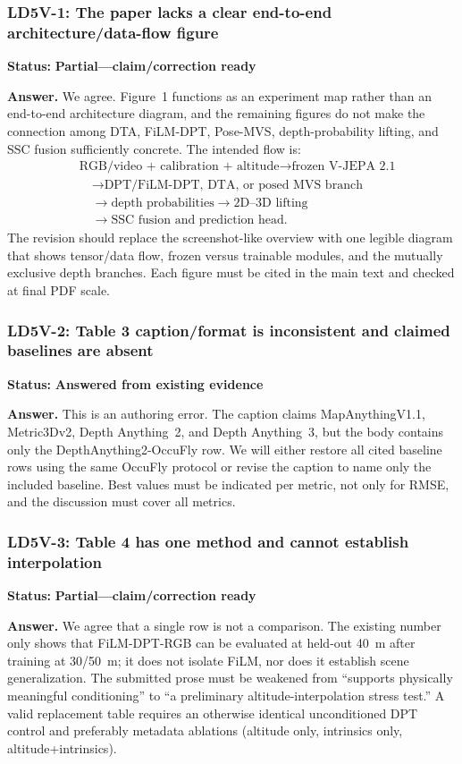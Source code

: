 \documentclass[10pt]{article}
\newcommand{\answered}{\textcolor{answered}{\textbf{Answered from existing evidence}}}
\newcommand{\partialstatus}{\textcolor{partial}{\textbf{Partial---claim/correction ready}}}
\newenvironment{reviewpoint}[2]
  {\subsubsection{#1}\noindent\textbf{Status:} #2\par\smallskip}
  {}
\begin{document}
\begin{reviewpoint}{LD5V-1: The paper lacks a clear end-to-end architecture/data-flow figure}{\partialstatus}
\textbf{Answer.} We agree. Figure~1 functions as an experiment map rather than an
end-to-end architecture diagram, and the remaining figures do not make the connection
among DTA, FiLM-DPT, Pose-MVS, depth-probability lifting, and SSC fusion sufficiently
concrete. The intended flow is:
\begin{align*}
&\text{RGB/video + calibration + altitude}
  \rightarrow \text{frozen V-JEPA 2.1}\\
&\quad\rightarrow \text{DPT/FiLM-DPT, DTA, or posed MVS branch}\\
&\quad\rightarrow \text{depth probabilities}
  \rightarrow \text{2D--3D lifting}\\
&\quad\rightarrow \text{SSC fusion and prediction head}.
\end{align*}
The revision should replace the screenshot-like overview with one legible diagram that
shows tensor/data flow, frozen versus trainable modules, and the mutually exclusive depth
branches. Each figure must be cited in the main text and checked at final PDF scale.
\end{reviewpoint}

\begin{reviewpoint}{LD5V-2: Table 3 caption/format is inconsistent and claimed baselines are absent}{\answered}
\textbf{Answer.} This is an authoring error. The caption claims MapAnythingV1.1,
Metric3Dv2, Depth Anything~2, and Depth Anything~3, but the body contains only the
DepthAnything2-OccuFly row. We will either restore all cited baseline rows using the same
OccuFly protocol or revise the caption to name only the included baseline. Best values
must be indicated per metric, not only for RMSE, and the discussion must cover all metrics.
\end{reviewpoint}

\begin{reviewpoint}{LD5V-3: Table 4 has one method and cannot establish interpolation}{\partialstatus}
\textbf{Answer.} We agree that a single row is not a comparison. The existing number only
shows that FiLM-DPT-RGB can be evaluated at held-out 40~m after training at 30/50~m; it
does not isolate FiLM, nor does it establish scene generalization. The submitted prose
must be weakened from ``supports physically meaningful conditioning'' to ``a preliminary
altitude-interpolation stress test.'' A valid replacement table requires an otherwise
identical unconditioned DPT control and preferably metadata ablations (altitude only,
intrinsics only, altitude+intrinsics).
\end{reviewpoint}
\end{document}
